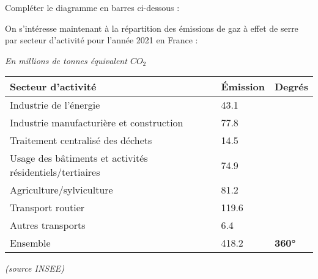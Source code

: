\documentclass[../Cours.tex]{subfiles}
\begin{document}
\begin{questions}
    \question Compléter le diagramme en barres ci-dessous : 
    \begin{center}
    \end{center}

    On s'intéresse maintenant à la répartition des émissions de gaz à effet de serre par secteur d'activité pour l'année 2021 en France : 
    \begin{center}
        \begin{flushright}
            \textit{En millions de tonnes équivalent $CO_2$}
        \end{flushright}
        \begin{tabularx}{0.8\linewidth}{|l|X|X|}\hline
        Secteur d'activité & Émission & Degrés \\\hline\hline
        Industrie de l’énergie & \num{43.1} &  \\\hline
        Industrie manufacturière et construction & \num{77.8} &  \\\hline
        Traitement centralisé des déchets & \num{14.5} &  \\\hline
        Usage des bâtiments et activités résidentiels/tertiaires & \num{74.9} &  \\\hline
        Agriculture/sylviculture & \num{81.2} &  \\\hline
        Transport routier & \num{119.6} & \\\hline
        Autres transports & \num{6.4} &  \\\hline\hline
        Ensemble & \num{418.2} & \textbf{\ang{360}} \\\hline
        \end{tabularx}
        \begin{flushright}\vspace{-0.8em}
            \textit{(source INSEE)}
        \end{flushright}
    \end{center}


\end{questions}
\end{document}
